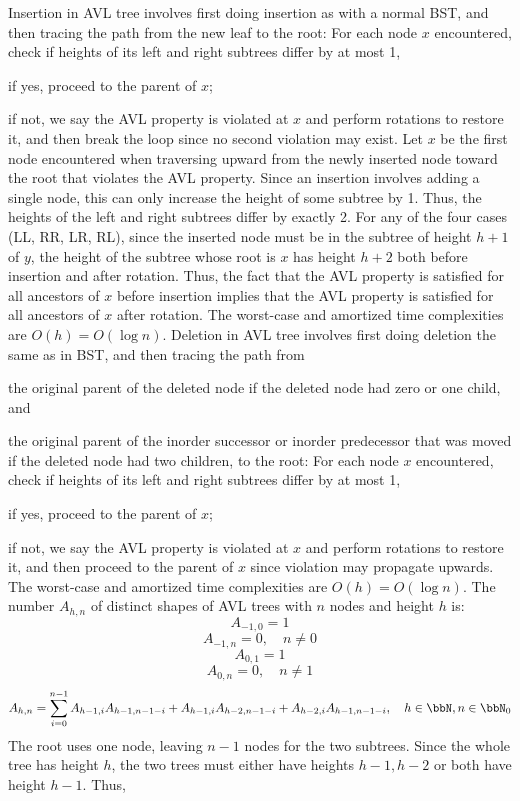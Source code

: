 \documentclass[a4paper,12pt]{article}
\begin{document}
\eit
{}
Insertion in AVL tree involves first doing insertion as with a normal BST, and then tracing the path from the new leaf to the root: For each node $x$ encountered, check if heights of its left and right subtrees differ by at most 1,
\bit
\item if yes, proceed to the parent of $x$;
\item if not, we say the AVL property is violated at $x$ and perform rotations to restore it, and then break the loop since no second violation may exist.
\eit
\bpr
Let $x$ be the first node encountered when traversing upward from the newly inserted node toward the root that violates the AVL property. Since an insertion involves adding a single node, this can only increase the height of some subtree by 1. Thus, the heights of the left and right subtrees differ by exactly 2. For any of the four cases (LL, RR, LR, RL), since the inserted node must be in the subtree of height $h+1$ of $y$, the height of the subtree whose root is $x$ has height $h+2$ both before insertion and after rotation. Thus, the fact that the AVL property is satisfied for all ancestors of $x$ before insertion implies that the AVL property is satisfied for all ancestors of $x$ after rotation.
\epr
The worst-case and amortized time complexities are $O(h)=O(\log n)$.
Deletion in AVL tree involves first doing deletion the same as in BST, and then tracing the path from
\bit
\item the original parent of the deleted node if the deleted node had zero or one child, and
\item the original parent of the inorder successor or inorder predecessor that was moved if the deleted node had two children,
\eit
to the root: For each node $x$ encountered, check if heights of its left and right subtrees differ by at most 1,
\bit
\item if yes, proceed to the parent of $x$;
\item if not, we say the AVL property is violated at $x$ and perform rotations to restore it, and then proceed to the parent of $x$ since violation may propagate upwards.
\eit
The worst-case and amortized time complexities are $O(h)=O(\log n)$.
The number $A_{h,n}$ of distinct shapes of AVL trees with $n$ nodes and height $h$ is:
\[A_{-1,0}=1\]
\[A_{-1,n}=0,\quad n\ne0\]
\[A_{0,1}=1\]
\[A_{0,n}=0,\quad n\ne1\]
\[A_{h,n}=\sum_{i=0}^{n-1}A_{h-1,i}A_{h-1,n-1-i}+A_{h-1,i}A_{h-2,n-1-i}+A_{h-2,i}A_{h-1,n-1-i},\quad h\in\bbN,n\in\bbN_0\]
\bpr
The root uses one node, leaving $n-1$ nodes for the two subtrees. Since the whole tree has height $h$, the two trees must either have heights $h-1,h-2$ or both have height $h-1$. Thus,
\end{document}
